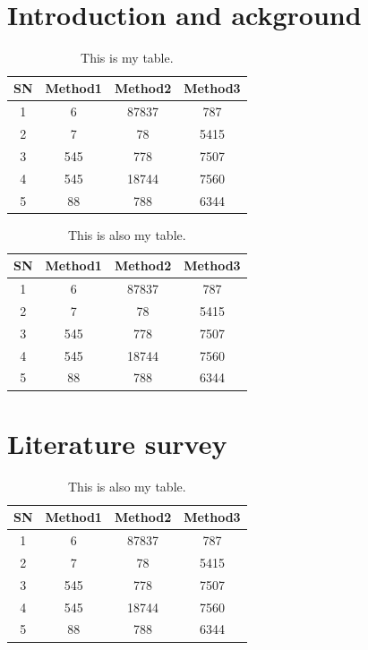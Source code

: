 \begin{center}
{\huge\textbf{\ttitle}}\\
\end{center}
\section{Introduction and ackground}
\begin{table}[h!]
\centering
 \begin{tabular}{c c c c} 
 \hline
 SN & Method1 & Method2 & Method3 \\ [0.5ex] 
 \hline
 1 & 6 & 87837 & 787 \\ 
 2 & 7 & 78 & 5415 \\
 3 & 545 & 778 & 7507 \\
 4 & 545 & 18744 & 7560 \\
 5 & 88 & 788 & 6344 \\ [1ex] 
 \hline
 \end{tabular}
 \caption{\label{tab:mytab1} This is my table.}
\end{table}


\begin{table}[h!]
\centering
 \begin{tabular}{c c c c} 
 \hline
 SN & Method1 & Method2 & Method3 \\ [0.5ex] 
 \hline
 1 & 6 & 87837 & 787 \\ 
 2 & 7 & 78 & 5415 \\
 3 & 545 & 778 & 7507 \\
 4 & 545 & 18744 & 7560 \\
 5 & 88 & 788 & 6344 \\ [1ex] 
 \hline
 \end{tabular}
 \caption{\label{tab:mytab2} This is also my table.}
\end{table}


\clearpage
\section{Literature survey}
\begin{table}[h!]
\centering
 \begin{tabular}{c c c c} 
 \hline
 SN & Method1 & Method2 & Method3 \\ [0.5ex] 
 \hline
 1 & 6 & 87837 & 787 \\ 
 2 & 7 & 78 & 5415 \\
 3 & 545 & 778 & 7507 \\
 4 & 545 & 18744 & 7560 \\
 5 & 88 & 788 & 6344 \\ [1ex] 
 \hline
 \end{tabular}
 \caption{\label{tab:mytab3} This is also my table.}
\end{table}\clearpage





